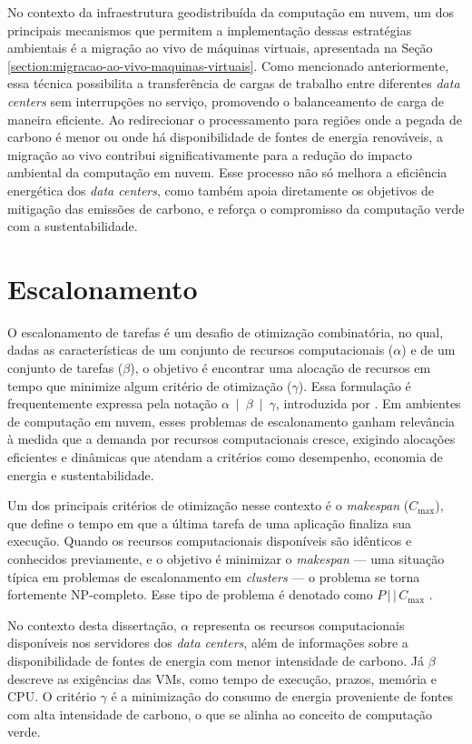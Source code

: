 \documentclass[
	12pt,				%
	oneside,			%
	a4paper,			%
	english,			%
	brazil				%
	]{abntex2ppgsi}
\begin{document}
No contexto da infraestrutura geodistribuída da computação em nuvem, um dos principais mecanismos que permitem a implementação dessas estratégias ambientais é a migração ao vivo de máquinas virtuais, apresentada na Seção \ref{section:migracao-ao-vivo-maquinas-virtuais}. Como mencionado anteriormente, essa técnica possibilita a transferência de cargas de trabalho entre diferentes \textit{data centers} sem interrupções no serviço, promovendo o balanceamento de carga de maneira eficiente. Ao redirecionar o processamento para regiões onde a pegada de carbono é menor ou onde há disponibilidade de fontes de energia renováveis, a migração ao vivo contribui significativamente para a redução do impacto ambiental da computação em nuvem. Esse processo não só melhora a eficiência energética dos \textit{data centers}, como também apoia diretamente os objetivos de mitigação das emissões de carbono, e reforça o compromisso da computação verde com a sustentabilidade.

\section{Escalonamento}\label{section:escalonamento}

O escalonamento de tarefas é um desafio de otimização combinatória, no qual, dadas as características de um conjunto de recursos computacionais ($\alpha$) e de um conjunto de tarefas ($\beta$), o objetivo é encontrar uma alocação de recursos em tempo que minimize algum critério de otimização ($\gamma$). Essa formulação é frequentemente expressa pela notação \mbox{$\alpha$ $\vert$ $\beta$ $\vert$ $\gamma$}, introduzida por . Em ambientes de computação em nuvem, esses problemas de escalonamento ganham relevância à medida que a demanda por recursos computacionais cresce, exigindo alocações eficientes e dinâmicas que atendam a critérios como desempenho, economia de energia e sustentabilidade.

Um dos principais critérios de otimização nesse contexto é o \textit{makespan} ($C_{\max}$), que define o tempo em que a última tarefa de uma aplicação finaliza sua execução. Quando os recursos computacionais disponíveis são idênticos e conhecidos previamente, e o objetivo é minimizar o \textit{makespan} --- uma situação típica em problemas de escalonamento em \textit{clusters} --- o problema se torna fortemente NP-completo. Esse tipo de problema é denotado como $P\,\vert\,\vert\,C_{\max}$ \cite{GRAHAM1979287}.

No contexto desta dissertação, $\alpha$ representa os recursos computacionais disponíveis nos servidores dos \textit{data centers}, além de informações sobre a disponibilidade de fontes de energia com menor intensidade de carbono. Já $\beta$ descreve as exigências das VMs, como tempo de execução, prazos, memória e CPU. O critério $\gamma$ é a minimização do consumo de energia proveniente de fontes com alta intensidade de carbono, o que se alinha ao conceito de computação verde.
\end{document}
